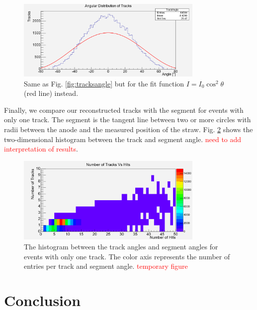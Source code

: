 \documentclass[a4paper]{report}
\numberwithin{equation}{section}
\begin{document}
\begin{figure}[!h]
	\centering
	\includegraphics[width=0.8\textwidth]{trackangle_cos2fit.png}
	\caption{Same as Fig. \ref{fig:tracksangle} but for the fit function $I = I_0 \cos^2 \theta$ (red line) instead. }
	\label{fig:tracksangle_cos2fit}
\end{figure} \par


Finally, we compare our reconstructed tracks with the segment for events with only one track. 
The segment is the tangent line between two or more circles with radii between the anode and the measured position of the straw. 
Fig. \ref{fig:trackvssegment} shows the two-dimensional histogram between the track and segment angle. \textcolor{red}{need to add interpretation of results}.

\begin{figure}[!h]
	\centering
	\includegraphics[width=0.8\textwidth]{trackvshits.png}
	\caption{The histogram between the track angles and segment angles for events with only one track. The 
	color axis represents the number of entries per track and segment angle. \textcolor{red}{temporary figure}}
	\label{fig:trackvssegment}
\end{figure}

\chapter{Conclusion} \label{chap:concl}
\end{document}
